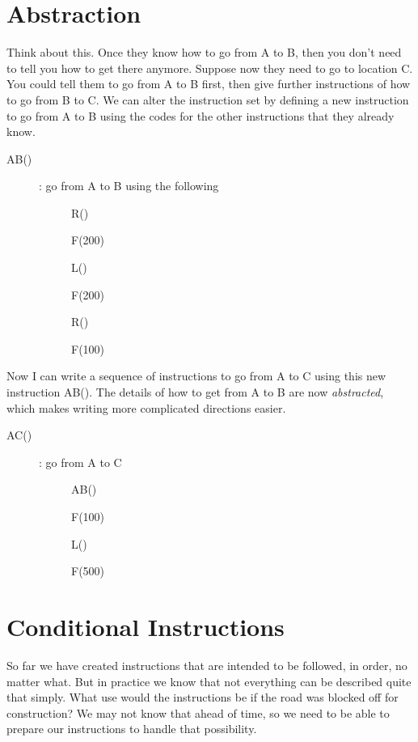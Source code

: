 \section{Abstraction}


Think about this. Once they know how to go from A to B, then you don't need to tell you how to get there anymore. Suppose now they need to go to location C. You could tell them to go from A to B first, then give further instructions of how to go from B to C. We can alter the instruction set by defining a new instruction to go from A to B using the codes for the other instructions that they already know.\\

\begin{description}
	\item[AB()] : go from A to B using the following
	\begin{description}
		\item[] R()
		\item[] F(200)
		\item[] L()
		\item[] F(200)
		\item[] R()
		\item[] F(100)
	\end{description}
\end{description}

Now I can write a sequence of instructions to go from A to C using this new instruction AB(). The details of how to get from A to B are now \textit{abstracted}, which makes writing more complicated directions easier.
\begin{description}
	\item[AC()] : go from A to C
	\begin{description}
		\item[] AB()
		\item[] F(100)
		\item[] L()
		\item[] F(500)
	\end{description}
\end{description}

\section{Conditional Instructions}

So far we have created instructions that are intended to be followed, in order, no matter what. But in practice we know that not everything can be described quite that simply. What use would the instructions be if the road was blocked off for construction? We may not know that ahead of time, so we need to be able to prepare our instructions to handle that possibility.\\

